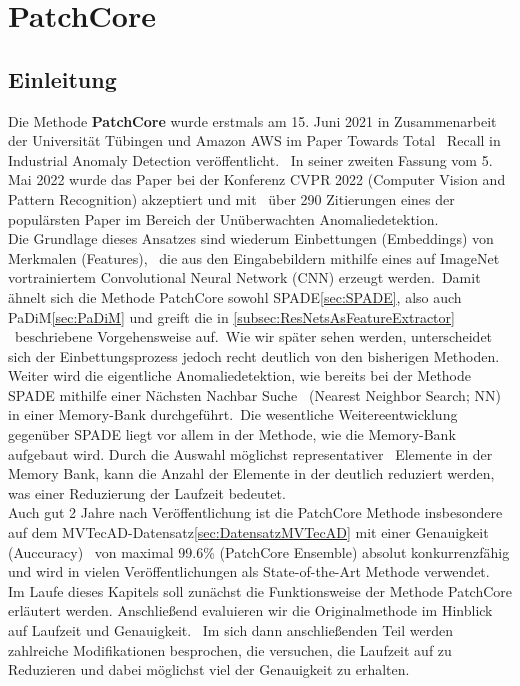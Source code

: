 
\chapter{PatchCore \cite{patchcore}}\label{ch:PatchCore}
\section{Einleitung}\label{sec:EinleitungPatchCore}
Die Methode \textbf{PatchCore} wurde erstmals am 15. Juni 2021 in Zusammenarbeit der Universität Tübingen und Amazon AWS im Paper \glqq Towards Total \ 
Recall in Industrial Anomaly Detection\grqq{} veröffentlicht. \ 
In seiner zweiten Fassung vom 5. Mai 2022 wurde das Paper bei der Konferenz CVPR 2022 (Computer Vision and Pattern Recognition) akzeptiert und mit \ 
über 290 Zitierungen eines der populärsten Paper im Bereich der Unüberwachten Anomaliedetektion.\\
Die Grundlage dieses Ansatzes sind wiederum \glqq Einbettungen\grqq{} (Embeddings) von Merkmalen (Features), \ 
die aus den Eingabebildern mithilfe eines auf \glqq ImageNet\grqq{} vortrainiertem \glqq Convolutional Neural Network (CNN)\grqq{} erzeugt werden.\
Damit ähnelt sich die Methode PatchCore sowohl SPADE\ref{sec:SPADE}, also auch PaDiM\ref{sec:PaDiM} und greift die in \ref{subsec:ResNetsAsFeatureExtractor} \
beschriebene Vorgehensweise auf.\
Wie wir später sehen werden, unterscheidet sich der Einbettungsprozess jedoch recht deutlich von den bisherigen Methoden.\
Weiter wird die eigentliche Anomaliedetektion, wie bereits bei der Methode SPADE mithilfe einer Nächsten Nachbar Suche \ 
(Nearest Neighbor Search; NN) in einer \glqq Memory-Bank \grqq{} durchgeführt.\
Die wesentliche Weitereentwicklung gegenüber SPADE liegt vor allem in der Methode, wie die Memory-Bank aufgebaut wird. Durch die Auswahl möglichst representativer \
Elemente in der Memory Bank, kann die Anzahl der Elemente in der deutlich reduziert werden, was einer Reduzierung der Laufzeit bedeutet.\\
Auch gut 2 Jahre nach Veröffentlichung ist die PatchCore Methode insbesondere auf dem MVTecAD-Datensatz\ref{sec:DatensatzMVTecAD} mit einer Genauigkeit (Auccuracy) \ 
von maximal \num{99,6}\% (\glqq PatchCore Ensemble\grqq{}) absolut konkurrenzfähig und wird in vielen Veröffentlichungen als \glqq State-of-the-Art\grqq{} Methode verwendet.\\
Im Laufe dieses Kapitels soll zunächst die Funktionsweise der Methode PatchCore erläutert werden. Anschließend evaluieren wir die Originalmethode im Hinblick auf Laufzeit und Genauigkeit. \
Im sich dann anschließenden Teil werden zahlreiche Modifikationen besprochen, die versuchen, die Laufzeit auf zu Reduzieren und dabei möglichst viel der Genauigkeit zu erhalten.\

